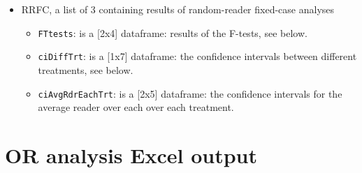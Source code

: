\documentclass[
]{book}
\newenvironment{Shaded}{\begin{snugshade}}{\end{snugshade}}
\newcommand{\CommentTok}[1]{\textcolor[rgb]{0.56,0.35,0.01}{\textit{#1}}}
\newcommand{\NormalTok}[1]{#1}
\newcommand{\SpecialCharTok}[1]{\textcolor[rgb]{0.00,0.00,0.00}{#1}}
\providecommand{\tightlist}{%
  \setlength{\itemsep}{0pt}\setlength{\parskip}{0pt}}
\begin{document}
\begin{Shaded}
\end{Shaded}

\begin{itemize}
\tightlist
\item
  RRFC, a list of 3 containing results of random-reader fixed-case analyses

  \begin{itemize}
  \tightlist
  \item
    \texttt{FTtests}: is a {[}2x4{]} dataframe: results of the F-tests, see below.
  \item
    \texttt{ciDiffTrt}: is a {[}1x7{]} dataframe: the confidence intervals between different treatments, see below.
  \item
    \texttt{ciAvgRdrEachTrt}: is a {[}2x5{]} dataframe: the confidence intervals for the average reader over each over each treatment.
  \end{itemize}
\end{itemize}

\begin{Shaded}
\end{Shaded}

\hypertarget{quick-start-or-excel}{%
\chapter{OR analysis Excel output}\label{quick-start-or-excel}}
\end{document}
